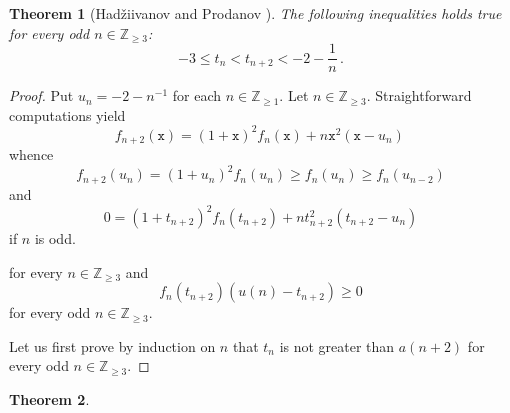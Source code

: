 \documentclass[12pt]{article}
\newcommand{\bZ}{\mathbb{Z}}
\newcommand{\bN}[1]{\bZ_{\ge #1}}
\newcommand{\ttx}{\mathtt{x}}
\newtheorem{theorem}{Theorem}
\begin{document}
 \begin{theorem} [Had\v{z}iivanov and Prodanov \cite{MitrinovicAI}] \label{thm:bulgare}
   The following inequalities holds true for every odd $n \in \bN{3}$:
   $$ - 3 \le t_n < t_{n + 2} < - 2 - \frac{1}{n} \,.
   $$
 \end{theorem}
 
 \begin{proof}
   Put $u_n = - 2 - n^{-1}$ for each $n \in \bN{1}$.
   Let $n \in \bN{3}$.
   Straightforward computations yield 
   $$
   f_{n + 2} (\ttx) = {(1 + \ttx)}^2 f_n(\ttx) + n \ttx^2 (\ttx - u_n) \,
   $$
   whence
   $$
   f_{n + 2}(u_n) = {(1 + u_n)}^2 f_n(u_n) \ge f_n(u_n) \ge f_n(u_{n - 2})
   $$
   and
   $$
   0 = {(1 + t_{n + 2})}^2 f_n(t_{n + 2}) +  n t_{n + 2}^2 (t_{n + 2} - u_n)  
   $$
   if $n$ is odd.
   

   
   
 for every $n \in \bN{3}$ and
 $$
 f_n(t_{n + 2})  (u(n) - t_{n + 2})  \ge 0
 $$
 for every odd $n \in \bN{3}$.
 
   Let us first prove by induction on $n$ that $t_n$ is not greater than $a(n + 2)$ for every odd $n \in \bN{3}$.
   
 \end{proof}
 \begin{theorem}
   \label{lem:odd-two-roots}

 \end{theorem}
\end{document}
